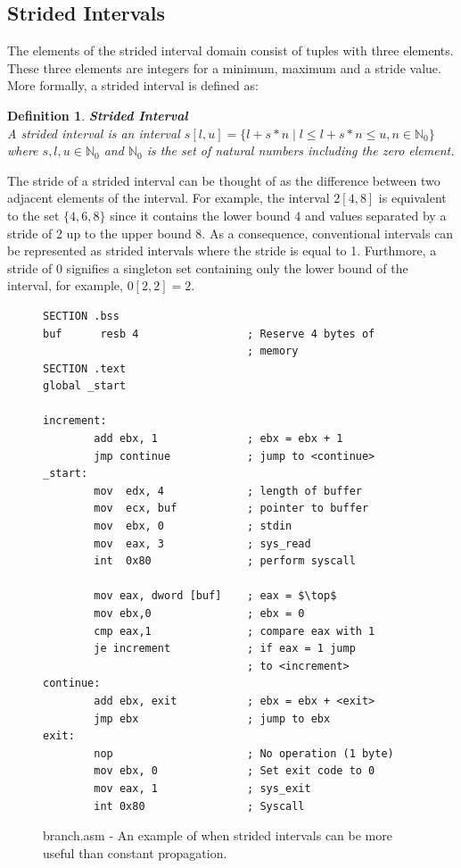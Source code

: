 \documentclass{kththesis}
\newtheorem*{definition}{Definition}
\newcommand{\fbcomment}[1]{{#1}}
\renewcommand{\fbcomment}[1]{}
\begin{document}
\subsection{Strided Intervals}\label{sec:absDomInt}
\fbcomment{\color{red}Goal: Introduce strided intervals and show an example of when it is more useful than constant propagation.}
The elements of the strided interval domain consist of tuples with three elements. These three elements are integers for a minimum, maximum and a stride value. More formally, a strided interval is defined as: 
\begin{definition}\textbf{Strided Interval}\\
A strided interval is an interval $s[l,u]=\{l + s * n\;|\;l \leq l + s * n \leq u, n \in \mathbb{N}_0 \}$ where $s,l,u \in \mathbb{N}_0$ and $\mathbb{N}_0$ is the set of natural numbers including the zero element.
\end{definition}
\noindent The stride of a strided interval can be thought of as the difference between two adjacent elements of the interval. For example, the interval $2[4,8]$ is equivalent to the set $\{4,6,8\}$ since it contains the lower bound 4 and values separated by a stride of 2 up to the upper bound 8. As a consequence, conventional intervals can be represented as strided intervals where the stride is equal to 1. Furthmore, a stride of 0 signifies a singleton set containing only the lower bound of the interval, for example, $0[2,2] = 2$.
\begin{figure}[ht]
    \centering
\begin{tcolorbox}
\begin{verbatim}
SECTION .bss
buf      resb 4                 ; Reserve 4 bytes of
                                ; memory
SECTION .text
global _start

increment:
        add ebx, 1              ; ebx = ebx + 1
        jmp continue            ; jump to <continue>
_start:
        mov  edx, 4             ; length of buffer
        mov  ecx, buf           ; pointer to buffer
        mov  ebx, 0             ; stdin
        mov  eax, 3             ; sys_read
        int  0x80               ; perform syscall

        mov eax, dword [buf]    ; eax = $\top$
        mov ebx,0               ; ebx = 0
        cmp eax,1               ; compare eax with 1
        je increment            ; if eax = 1 jump
                                ; to <increment>
continue:
        add ebx, exit           ; ebx = ebx + <exit>
        jmp ebx                 ; jump to ebx
exit:
        nop                     ; No operation (1 byte)
        mov ebx, 0              ; Set exit code to 0
        mov eax, 1              ; sys_exit
        int 0x80                ; Syscall
\end{verbatim}
\end{tcolorbox}
\caption{branch.asm - An example of when strided intervals can be more useful than constant propagation.}
    \label{fig:branch.asm}
\end{figure}
\end{document}
